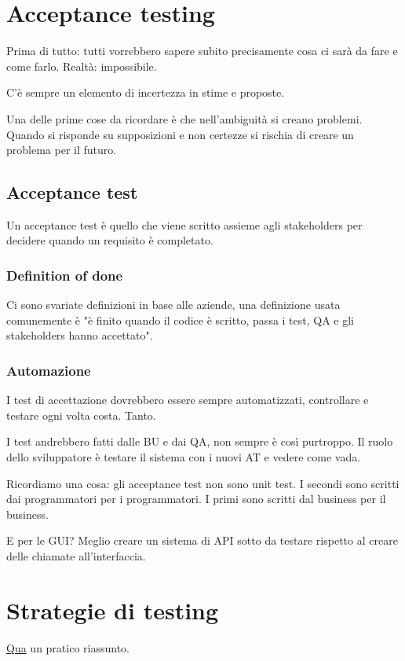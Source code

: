 \documentclass[11pt,a4paper]{book}
\begin{document}
\chapter{Acceptance testing}
Prima di tutto: tutti vorrebbero sapere subito precisamente cosa ci sarà da fare e come farlo. Realtà: impossibile.

C'è sempre un elemento di incertezza in stime e proposte.

Una delle prime cose da ricordare è che nell'ambiguità si creano problemi. Quando si risponde su supposizioni e non certezze si rischia di creare un problema per il futuro.

\section{Acceptance test}
Un acceptance test è quello che viene scritto assieme agli stakeholders per decidere quando un requisito è completato.

\subsection{Definition of done}
Ci sono svariate definizioni in base alle aziende, una definizione usata comunemente è "è finito quando il codice è scritto, passa i test, QA e gli stakeholders hanno accettato".

\subsection{Automazione}
I test di accettazione dovrebbero essere sempre automatizzati, controllare e testare ogni volta costa. Tanto.

I test andrebbero fatti dalle BU e dai QA, non sempre è così purtroppo. Il ruolo dello sviluppatore è testare il sistema con i nuovi AT e vedere come vada.

Ricordiamo una cosa: gli acceptance test non sono unit test. I secondi sono scritti dai programmatori per i programmatori. I primi sono scritti dal business per il business. 

E per le GUI? Meglio creare un sistema di API sotto da testare rispetto al creare delle chiamate all'interfaccia.

\chapter{Strategie di testing}
\href{https://github.com/JacopoDeAngelis/Appunti-vari/blob/master/Testing/Testing.pdf}{Qua} un pratico riassunto.
\end{document}
